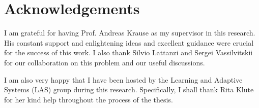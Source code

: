 \section{Acknowledgements}
I am grateful for having Prof. Andreas Krause as my supervisor in this research. His constant support and enlightening ideas and excellent guidance were crucial for the success of this work. I also thank Silvio Lattanzi and Sergei Vassilvitskii for our collaboration on this problem and our useful discussions. 

I am also very happy that I have been hosted by the Learning and Adaptive Systems (LAS) group during this research. Specifically, I shall thank Rita Klute for her kind help throughout the process of the thesis.

